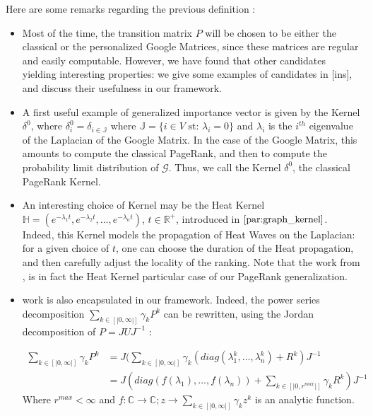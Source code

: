 \documentclass{article}
\begin{document}
Here are some remarks regarding the previous definition :
\begin{itemize}
    \item Most of the time, the transition matrix $P$ will be chosen to be either the classical or the personalized Google Matrices, since these matrices are regular and easily computable. However, we have found that other candidates yielding interesting properties: we give some examples of candidates in [ins], and discuss their usefulness in our framework.

    \item A first useful example of generalized importance vector is given by the Kernel $\delta^0$, where $\delta^0_{i} = \delta_{i \in \mathbb{J}}$ where $\mathbb{J} = \{ i \in V \mbox{ st: } \lambda_i = 0 \}$ and $\lambda_i$ is the $i^{th}$ eigenvalue of the Laplacian of the Google Matrix. In the case of the Google Matrix, this amounts to compute the classical PageRank, and then to compute the probability limit distribution of $\mathcal{G}$. Thus, we call the Kernel $\delta^0$, the classical PageRank Kernel.
    
    \item An interesting choice of Kernel may be the Heat Kernel $\mathbb{H} = (e^{-\lambda_1 t}, e^{-\lambda_2 t}, \hdots, e^{-\lambda_n t})$, $t \in \mathbb{R^+}$, introduced in $\ref{par:graph_kernel}$. Indeed, this Kernel models the propagation of Heat Waves on the Laplacian: for a given choice of $t$, one can choose the duration of the Heat propagation, and then carefully adjust the locality of the ranking. Note that the work from \cite{yang_king_lyu_2007}, is in fact the Heat Kernel particular case of our PageRank generalization.
    
    \item \cite{baeza-yates_boldi_castillo_2006} work is also encapsulated in our framework. Indeed, the power series decomposition $\underset{k\in [|0,\infty|]}{\sum} \gamma_k P^k$ can be rewritten, using the Jordan decomposition of $P=JUJ^{-1}$ : 
    
    \begin{align}
        \underset{k\in [|0,\infty|]}{\sum} \gamma_k P^k &= J (\underset{k\in [|0,\infty|]}{\sum} \gamma_k (diag(\lambda_1^k, \hdots, \lambda_n^k) + R^k) J^{-1} \\ &= J  (diag(f(\lambda_1), \hdots, f(\lambda_n)) + \underset{k\in [|0,r^{max}|]}{\sum} \gamma_k R^k) J^{-1}
    \end{align} 
    Where $r^{max} < \infty$ and $f : \mathbb{C} \rightarrow \mathbb{C}; z \rightarrow \underset{k\in [|0,\infty|]}{\sum} \gamma_k z^k$ is an analytic function.
    
\end{itemize}
\end{document}
